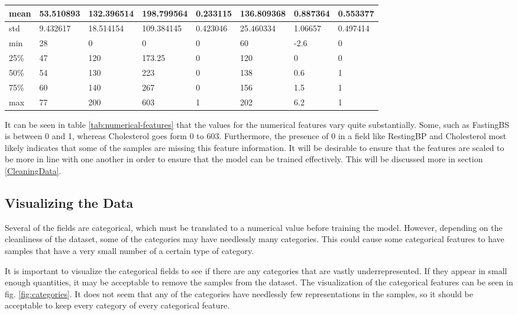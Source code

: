 \documentclass[12pt,conference]{IEEEtran}
\begin{document}
\begin{table}[t]
\begin{tabular}{|l|l|l|l|l|l|l|l|}
        mean & 53.510893 & 132.396514 & 198.799564 & 0.233115 & 136.809368 & 0.887364 & 0.553377 \\ \hline
        std & 9.432617 & 18.514154 & 109.384145 & 0.423046 & 25.460334 & 1.06657 & 0.497414 \\ \hline
        min & 28 & 0 & 0 & 0 & 60 & -2.6 & 0 \\ \hline
        25\% & 47 & 120 & 173.25 & 0 & 120 & 0 & 0 \\ \hline
        50\% & 54 & 130 & 223 & 0 & 138 & 0.6 & 1 \\ \hline
        75\% & 60 & 140 & 267 & 0 & 156 & 1.5 & 1 \\ \hline
        max & 77 & 200 & 603 & 1 & 202 & 6.2 & 1 \\ \hline
    \end{tabular}
\end{table}

It can be seen in table \ref{tab:numerical-features} that the values for the numerical features vary quite substantially. Some, such as FastingBS is between 0 and 1, whereas Cholesterol goes form 0 to 603. Furthermore, the presence of 0 in a field like RestingBP and Cholesterol most likely indicates that some of the samples are missing this feature information. It will be desirable to ensure that the features are scaled to be more in line with one another in order to ensure that the model can be trained effectively. This will be discussed more in section \ref{CleaningData}.

\subsection{Visualizing the Data}
Several of the fields are categorical, which must be translated to a numerical value before training the model. However, depending on the cleanliness of the dataset, some of the categories may have needlessly many categories. This could cause some categorical features to have samples that have a very small number of a certain type of category.

It is important to visualize the categorical fields to see if there are any categories that are vastly underrepresented. If they appear in small enough quantities, it may be acceptable to remove the samples from the dataset. The visualization of the categorical features can be seen in fig. \ref{fig:categories}. It does not seem that any of the categories have needlessly few representations in the samples, so it should be acceptable to keep every category of every categorical feature.
\end{document}
